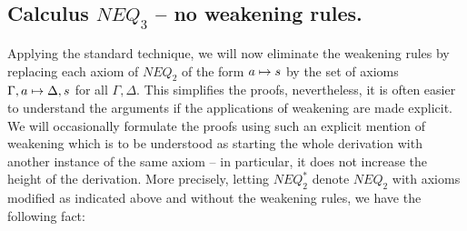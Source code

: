 \subsection{Calculus $NEQ_3$ -- no weakening rules.}
Applying the standard technique, we will now eliminate the weakening rules by
replacing each axiom of $NEQ_2$ of the form $a\mathrel{\mapsto} s$ by
the set of axioms $\Gamma,a \mathrel{\mapsto}\Delta, s$ for all $\Gamma, \Delta$.
This simplifies the proofs,
nevertheless, it is often easier to understand the arguments if
the applications of weakening are made explicit. We will occasionally
formulate the proofs using such an explicit mention of weakening which is to
be understood as starting the whole derivation with another instance of the
same axiom -- in particular, it does not increase the height of the
derivation. More precisely, letting $NEQ_2^*$ denote $NEQ_2$ with axioms 
modified as indicated above and without the weakening rules, we have the following fact:

